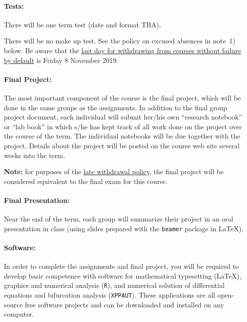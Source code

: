 \documentclass[12pt]{article}
\begin{document}


\paragraph*{Tests:}

There will be one term test (date and format TBA).

There will be no make up test. See the policy on excused absences in
note~1) below.  Be aware that the
\href{https://academiccalendars.romcmaster.ca/content.php?catoid=38&navoid=8059}{last
  day for withdrawing from courses without failure by default} is
Friday 8 November 2019.

\paragraph*{Final Project:}

The most important component of the course is the final project, which
will be done in the same groups as the assignments.  In addition to
the final group project document, each individual will submit her/his
own ``research notebook'' or ``lab book'' in which s/he has kept track
of all work done on the project over the course of the term.  The
individual notebooks will be due together with the project.  Details
about the project will be posted on the course web site several weeks
into the term.

\textbf{Note:} for purposes of the \href{https://academiccalendars.romcmaster.ca/content.php?catoid=38&navoid=8043#late_withdrawal}{late withdrawal policy}, the final project will be considered equivalent to the final exam for this course.

\paragraph*{Final Presentation:}
Near the end of the term, each group will summarize their project in an oral presentation in class (using slides prepared with the {\tt beamer} package in \LaTeX).

\paragraph*{Software:} In order to complete the assignments and final project, you will be required to develop basic competence with software for mathematical typesetting (\LaTeX), graphics and numerical analysis ({\tt R}), and numerical solution of differential equations and bifurcation analysis ({\tt XPPAUT}).  These applications are all open-source free software projects and can be downloaded and installed on any computer.
\end{document}
